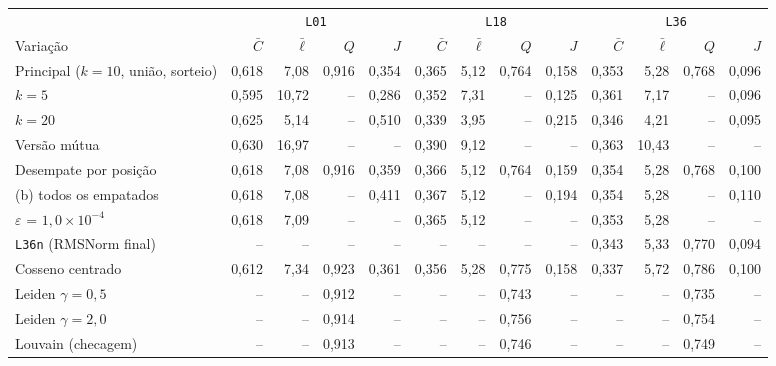 \footnotesize
\setlength{\tabcolsep}{3.5pt}
\begin{tabular}{lrrrrrrrrrrrr}
\toprule
 & \multicolumn{4}{c}{\texttt{L01}} & \multicolumn{4}{c}{\texttt{L18}} & \multicolumn{4}{c}{\texttt{L36}} \\
\cmidrule(lr){2-5}\cmidrule(lr){6-9}\cmidrule(lr){10-13}
Variação & $\bar C$ & $\bar\ell$ & $Q$ & $J$ & $\bar C$ & $\bar\ell$ & $Q$ & $J$ & $\bar C$ & $\bar\ell$ & $Q$ & $J$ \\
\midrule
Principal ($k=10$, união, sorteio) & 0,618 & 7,08 & 0,916 & 0,354 & 0,365 & 5,12 & 0,764 & 0,158 & 0,353 & 5,28 & 0,768 & 0,096 \\
$k=5$ & 0,595 & 10,72 & -- & 0,286 & 0,352 & 7,31 & -- & 0,125 & 0,361 & 7,17 & -- & 0,096 \\
$k=20$ & 0,625 & 5,14 & -- & 0,510 & 0,339 & 3,95 & -- & 0,215 & 0,346 & 4,21 & -- & 0,095 \\
Versão mútua & 0,630 & 16,97 & -- & -- & 0,390 & 9,12 & -- & -- & 0,363 & 10,43 & -- & -- \\
Desempate por posição & 0,618 & 7,08 & 0,916 & 0,359 & 0,366 & 5,12 & 0,764 & 0,159 & 0,354 & 5,28 & 0,768 & 0,100 \\
(b) todos os empatados & 0,618 & 7,08 & -- & 0,411 & 0,367 & 5,12 & -- & 0,194 & 0,354 & 5,28 & -- & 0,110 \\
$\varepsilon$ = $1{,}0\times10^{-4}$ & 0,618 & 7,09 & -- & -- & 0,365 & 5,12 & -- & -- & 0,353 & 5,28 & -- & -- \\
\texttt{L36n} (RMSNorm final) & -- & -- & -- & -- & -- & -- & -- & -- & 0,343 & 5,33 & 0,770 & 0,094 \\
Cosseno centrado & 0,612 & 7,34 & 0,923 & 0,361 & 0,356 & 5,28 & 0,775 & 0,158 & 0,337 & 5,72 & 0,786 & 0,100 \\
Leiden $\gamma=0,5$ & -- & -- & 0,912 & -- & -- & -- & 0,743 & -- & -- & -- & 0,735 & -- \\
Leiden $\gamma=2,0$ & -- & -- & 0,914 & -- & -- & -- & 0,756 & -- & -- & -- & 0,754 & -- \\
Louvain (checagem) & -- & -- & 0,913 & -- & -- & -- & 0,746 & -- & -- & -- & 0,749 & -- \\
\bottomrule
\end{tabular}

\par{}
